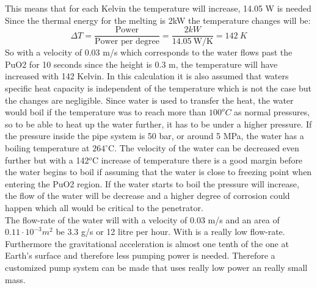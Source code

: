 This means that for each Kelvin the temperature will increase, 14.05 W is needed Since the thermal energy for the melting is 2kW the temperature changes will be: 
\begin{equation}\label{eq:waterheating2}
\Delta T = \frac{\text{Power}}{\text{Power per degree}} = \frac{2kW}{\SI{14.05} {\W\per\K} } = \SI{142}{K}
\end{equation}
So with a velocity of 0.03 m/s which corresponds to the water flows past the PuO2 for 10 seconds since the height is 0.3 m, the temperature will have increased with 142 Kelvin. In this calculation it is also assumed that waters specific heat capacity is independent of the temperature which is not the case but the changes are negligible. Since water is used to transfer the heat, the water would boil if the temperature was to reach more than $100^oC$ as normal pressures, so to be able to heat up the water further, it has to be under a higher pressure. If the pressure inside the pipe system is 50 bar, or around 5 MPa, the water has a boiling temperature at $264^\circ$C. The velocity of the water can be decreased even further but with a 142$^o$C increase of temperature there is a good margin before the water begins to boil if assuming that the water is close to freezing point when entering the PuO2 region. If the water starts to boil the pressure will increase, the flow of the water will be decrease and a higher degree of corrosion could happen which all would be critical to the penetrator. \\

\noindent
The flow-rate of the water will with a velocity of 0.03 m/s and an area of $0.11\cdot 10^{-3} m^2$ be 3.3 g/s or 12 litre per hour. With is a really low flow-rate. Furthermore the gravitational acceleration is almost one tenth of the one at Earth's surface and therefore less pumping power is needed. Therefore a customized pump system can be made that uses really low power an really small mass. 


